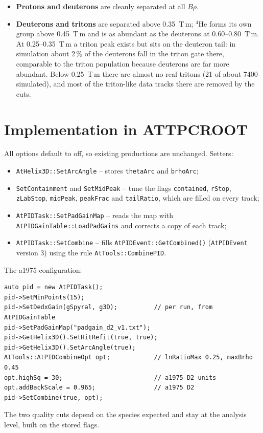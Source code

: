 \documentclass[11pt,a4paper]{article}
\newcommand{\brho}{$B\rho$}
\newcommand{\code}[1]{\texttt{#1}}
\begin{document}
\begin{itemize}
\item \textbf{Protons and deuterons} are cleanly separated at all \brho.
\item \textbf{Deuterons and tritons} are separated above 0.35~T\,m; $^4$He forms its own group above 0.45~T\,m and is
  as abundant as the deuterons at 0.60--0.80~T\,m. At 0.25--0.35~T\,m a triton peak exists but sits on the
  deuteron tail: in simulation about 2\,\% of the deuterons fall in the triton gate there, comparable to the triton
  population because deuterons are far more abundant. Below 0.25~T\,m there are almost no real tritons (21 of about
  7400 simulated), and most of the triton-like data tracks there are removed by the cuts.
\end{itemize}

\section{Implementation in ATTPCROOT}

All options default to off, so existing productions are unchanged. Setters:
\begin{itemize}
\item \code{AtHelix3D::SetArcAngle} -- stores \code{thetaArc} and \code{brhoArc};
\item \code{SetContainment} and \code{SetMidPeak} -- tune the flags \code{contained}, \code{rStop}, \code{zLabStop},
  \code{midPeak}, \code{peakFrac} and \code{tailRatio}, which are filled on every track;
\item \code{AtPIDTask::SetPadGainMap} -- reads the map with \code{AtPIDGainTable::LoadPadGains} and corrects a copy of
  each track;
\item \code{AtPIDTask::SetCombine} -- fills \code{AtPIDEvent::GetCombined()} (\code{AtPIDEvent} version 3) using the
  rule \code{AtTools::CombinePID}.
\end{itemize}
The a1975 configuration:
\begin{verbatim}
auto pid = new AtPIDTask();
pid->SetMinPoints(15);
pid->SetDedxGain(gSpyral, g3D);          // per run, from AtPIDGainTable
pid->SetPadGainMap("padgain_d2_v1.txt");
pid->GetHelix3D().SetHitRefit(true, true);
pid->GetHelix3D().SetArcAngle(true);
AtTools::AtPIDCombineOpt opt;            // lnRatioMax 0.25, maxBrho 0.45
opt.highSq = 30;                         // a1975 D2 units
opt.addBackScale = 0.965;                // a1975 D2
pid->SetCombine(true, opt);
\end{verbatim}
The two quality cuts depend on the species expected and stay at the analysis level, built on the stored flags.
\end{document}

